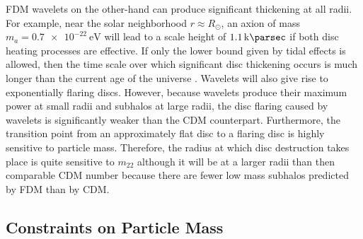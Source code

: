 \documentclass[usenatbib]{mnras}
\begin{document}
\par
FDM wavelets on the other-hand can produce significant thickening at all radii. For example, near the solar neighborhood $r \approx R_{\odot}$, an axion of mass $m_a = \SI{0.7 e-22}{\electronvolt}$ will lead to a scale height of $\SI{1.1}{\kilo\parsec}$ if both disc heating processes are effective. If only the lower bound given by tidal effects is allowed, then the time scale over which significant disc thickening occurs is much longer than the current age of the universe \citep{ultralight}. Wavelets will also give rise to exponentially flaring discs. However, because wavelets produce their maximum power at small radii and subhalos at large radii, the disc flaring caused by wavelets is significantly weaker than the CDM counterpart. Furthermore, the transition point from an approximately flat disc to a flaring disc is highly sensitive to particle mass. Therefore, the radius at which disc destruction takes place is quite sensitive to $m_{22}$ although it will be at a larger radii than then comparable CDM number because there are fewer low mass subhalos predicted by FDM than by CDM. 


\subsection{Constraints on Particle Mass}
\end{document}
